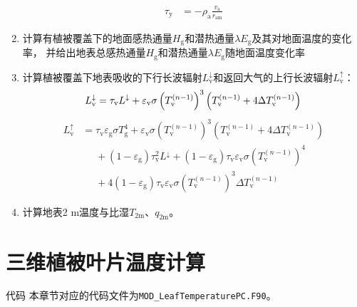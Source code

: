 \begin{enumerate}
\begin{equation}
\begin{aligned}
        \tau_{\mathrm{y}} & =- \rho_{\mathrm{a}} \frac{v_{\mathrm{a}}}{r_{\mathrm{am}}}
      \end{aligned}
    \end{equation}
  \item 计算有植被覆盖下的地面感热通量$H_{\mathrm{g}}$和潜热通量$\lambda E_{\mathrm{g}}$及其对地面温度的变化率，
    并给出地表总感热通量$H_{\mathrm {g}} $和潜热通量$\lambda E_{\mathrm {g}} $随地面温度变化率
  \item 计算植被覆盖下地表吸收的下行长波辐射$L_{\mathrm{v}}^\downarrow$和返回大气的上行长波辐射$L_{\mathrm v} ^\uparrow$：
    \begin{equation}
      L_{\mathrm{v}} ^\downarrow =  \tau_{\mathrm{v}} L ^\downarrow+\varepsilon_{\mathrm{v}}\sigma \left (T_{\mathrm{v}}^{(n - 1)}\right)^3\left( T_{\mathrm{v}}^{(n - 1)} + 4\Delta T_{\mathrm{v}}^{(n - 1)} \right)\\
    \end{equation}
    \begin{equation}
      \begin{aligned}
        L_{\mathrm{v}}^ \uparrow &=  \tau_{\mathrm{v}} \varepsilon_{\mathrm{g}} \sigma T_{\mathrm{g}}^{4}+ \varepsilon_{\mathrm{v}}\sigma \left ( T_{\mathrm{v}}^{(n - 1)}\right )^3\left( T_{\mathrm{v}}^{(n - 1)} + 4\Delta T_{\mathrm{v}}^{(n - 1)} \right) \\[1ex]
        &\mathrel{\phantom{=}} + \left ( 1- \varepsilon_{\mathrm{g}} \right)\tau_{\mathrm{v}}^2 L ^\downarrow + \left ( 1- \varepsilon_{\mathrm{g}} \right) \tau_{\mathrm{v}} \varepsilon_{\mathrm{v}} \sigma \left (T_{\mathrm{v}}^{(n - 1)}\right) ^4 \\[1ex]
        &\mathrel{\phantom{=}} + 4 \left ( 1- \varepsilon_{\mathrm{g}} \right) \tau_{\mathrm{v}} \varepsilon_{\mathrm{v}} \sigma \left (T_{\mathrm{v}}^{(n - 1)}\right)^3 \Delta T_{\mathrm{v}}^{(n - 1)}
      \end{aligned}
    \end{equation}
  \item 计算地表2 m温度与比湿$T_{\mathrm{2m}}$、$q_{\mathrm{2m}}$。
\end{enumerate}

\section{三维植被叶片温度计算}

\begin{mymdframed}{代码}
  本章节对应的代码文件为\texttt{MOD\_LeafTemperaturePC.F90}。
\end{mymdframed}

